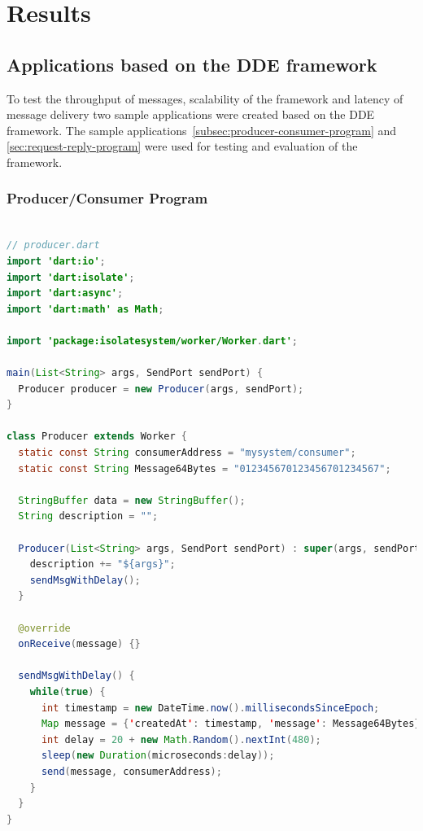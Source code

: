 \chapter{Results}
\label{chapter:results}

\section{Applications based on the DDE framework}
\label{sec:result-applications}
  To test the throughput of messages, scalability of the framework and latency of message delivery two sample applications were created based on the DDE framework. The sample applications~\autoref{subsec:producer-consumer-program} and
  \autoref{sec:request-reply-program} were used for testing and evaluation of the framework.

\subsection{Producer/Consumer Program}
\label{subsec:producer-consumer-program}


\begin{lstlisting}[language=java, firstnumber=1, caption=Basic version of Producer Worker of Producer-Consumer application, label=lst:producer]

// producer.dart
import 'dart:io';
import 'dart:isolate';
import 'dart:async';
import 'dart:math' as Math;

import 'package:isolatesystem/worker/Worker.dart';

main(List<String> args, SendPort sendPort) {
  Producer producer = new Producer(args, sendPort);
}

class Producer extends Worker {
  static const String consumerAddress = "mysystem/consumer";
  static const String Message64Bytes = "012345670123456701234567";

  StringBuffer data = new StringBuffer();
  String description = "";

  Producer(List<String> args, SendPort sendPort) : super(args, sendPort) {
    description += "${args}";
    sendMsgWithDelay();
  }

  @override
  onReceive(message) {}

  sendMsgWithDelay() {
    while(true) {
      int timestamp = new DateTime.now().millisecondsSinceEpoch;
      Map message = {'createdAt': timestamp, 'message': Message64Bytes};
      int delay = 20 + new Math.Random().nextInt(480);
      sleep(new Duration(microseconds:delay));
      send(message, consumerAddress);
    }
  }
}
\end{lstlisting}


